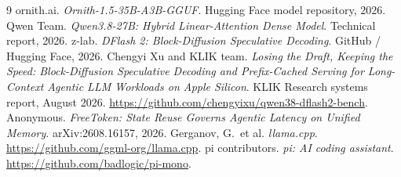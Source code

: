 \documentclass[11pt]{article}
\begin{document}

\begin{thebibliography}{9}
 ornith.ai. \emph{Ornith-1.5-35B-A3B-GGUF}. Hugging Face model repository, 2026.
 Qwen Team. \emph{Qwen3.8-27B: Hybrid Linear-Attention Dense Model}. Technical report, 2026.
 z-lab. \emph{DFlash 2: Block-Diffusion Speculative Decoding}. GitHub / Hugging Face, 2026.
 Chengyi Xu and KLIK team. \emph{Losing the Draft, Keeping the Speed: Block-Diffusion Speculative Decoding and Prefix-Cached Serving for Long-Context Agentic LLM Workloads on Apple Silicon}. KLIK Research systems report, August 2026. \url{https://github.com/chengyixu/qwen38-dflash2-bench}.
 Anonymous. \emph{FreeToken: State Reuse Governs Agentic Latency on Unified Memory}. arXiv:2608.16157, 2026.
 Gerganov, G.\ et al. \emph{llama.cpp}. \url{https://github.com/ggml-org/llama.cpp}.
 pi contributors. \emph{pi: AI coding assistant}. \url{https://github.com/badlogic/pi-mono}.
\end{thebibliography}
\end{document}
